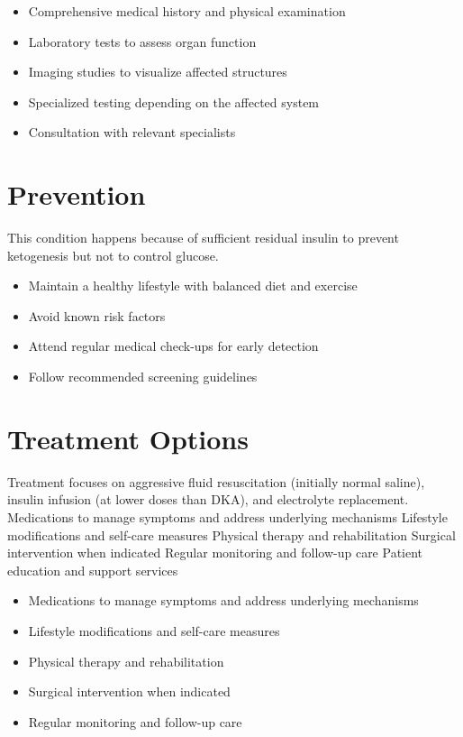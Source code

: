 \begin{itemize}[noitemsep]
  \item Comprehensive medical history and physical examination
  \item Laboratory tests to assess organ function
  \item Imaging studies to visualize affected structures
  \item Specialized testing depending on the affected system
  \item Consultation with relevant specialists
\end{itemize}
\section{Prevention}
This condition happens because of sufficient residual insulin to prevent ketogenesis but not to control glucose.

\begin{itemize}[noitemsep]
  \item Maintain a healthy lifestyle with balanced diet and exercise
  \item Avoid known risk factors
  \item Attend regular medical check-ups for early detection
  \item Follow recommended screening guidelines
\end{itemize}
\section{Treatment Options}
Treatment focuses on aggressive fluid resuscitation (initially normal saline), insulin infusion (at lower doses than DKA), and electrolyte replacement. Medications to manage symptoms and address underlying mechanisms Lifestyle modifications and self-care measures Physical therapy and rehabilitation Surgical intervention when indicated Regular monitoring and follow-up care Patient education and support services

\begin{itemize}[noitemsep]
  \item Medications to manage symptoms and address underlying mechanisms
  \item Lifestyle modifications and self-care measures
  \item Physical therapy and rehabilitation
  \item Surgical intervention when indicated
  \item Regular monitoring and follow-up care
\end{itemize}
